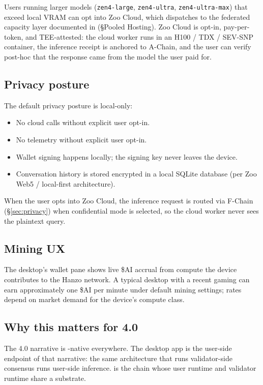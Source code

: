 Users running larger models (\texttt{zen4-large}, \texttt{zen4-ultra},
\texttt{zen4-ultra-max}) that exceed local VRAM can opt into Zoo Cloud,
which dispatches to the federated capacity layer documented in
\cite{zoo-per-llm-chains} (\S Pooled \GPU{} Hosting). Zoo Cloud is
opt-in, pay-per-token, and TEE-attested: the cloud worker runs in an
H100 / TDX / SEV-SNP container, the inference receipt is anchored to
A-Chain, and the user can verify post-hoc that the response came from
the model the user paid for.

\subsection{Privacy posture}

The default privacy posture is local-only:

\begin{itemize}[leftmargin=1.2em]
  \item No cloud calls without explicit user opt-in.
  \item No telemetry without explicit user opt-in.
  \item Wallet signing happens locally; the signing key never leaves
        the device.
  \item Conversation history is stored encrypted in a local SQLite
        database (per Zoo Web5 / local-first architecture).
\end{itemize}

When the user opts into Zoo Cloud, the inference request is routed via
\Lux{} F-Chain \FHE{} (\S\ref{sec:privacy}) when confidential mode is
selected, so the cloud worker never sees the plaintext query.

\subsection{Mining UX}

The desktop's wallet pane shows live \$AI accrual from compute the
device contributes to the Hanzo network. A typical desktop with a
recent gaming \GPU{} can earn approximately one \$AI per minute under
default mining settings; rates depend on market demand for the
device's compute class.

\subsection{Why this matters for \Zoo{} 4.0}

The \Zoo{} 4.0 narrative is \GPU{}-native everywhere. The desktop app
is the user-side endpoint of that narrative: the same \GPU{}
architecture that runs validator-side consensus runs user-side
inference. \Zoo{} is the chain whose user runtime and validator
runtime share a substrate.
